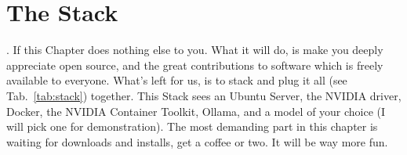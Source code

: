 %
%
%
%

%
\chapter{The Stack}
\label{ch:stack}
\vspace{1.5em}

. If this Chapter does nothing else to you.
What it will do, is make you deeply appreciate open source, and the great contributions
to software which is freely available to everyone. What's left for us, is to stack and plug it all (see Tab.~\ref{tab:stack}) together.
This Stack sees an Ubuntu Server, the NVIDIA driver, Docker, the NVIDIA Container 
Toolkit, Ollama, and a model of your choice (I will pick one for demonstration). The most demanding part in this chapter 
is waiting for downloads and installs, get a coffee or two. It will be way more fun.

